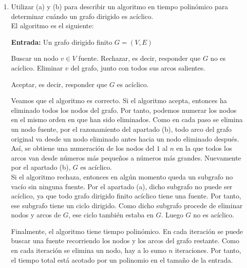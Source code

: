 \begin{ejercicio}
\begin{enumerate}
        \item[(c)] Utilizar (a) y (b) para describir un algoritmo en tiempo polinómico para determinar cuándo un grafo dirigido es acíclico. \\
            
            El algoritmo es el siguiente:

            \begin{algorithm}
                \caption{Decidir si un grafo dirigido es acíclico}
                \label{algorithm:aciclico}
                \begin{algorithmic}
                    \State \textbf{Entrada:} Un grafo dirigido finito $G=(V,E)$

                        \State Buscar un nodo $v\in V$ fuente.
                            \State Rechazar, es decir, responder que $G$ no es acíclico.
                        \EndIf
                        \State Eliminar $v$ del grafo, junto con todos sus arcos salientes.
                    \EndWhile

                    \State Aceptar, es decir, responder que $G$ es acíclico.
                \end{algorithmic}
            \end{algorithm}

            Veamos que el algoritmo es correcto. Si el algoritmo acepta, entonces ha eliminado todos los nodos del grafo. Por tanto, podemos numerar los nodos en el mismo orden en que han sido eliminados. Como en cada paso se elimina un nodo fuente, por el razonamiento del apartado (b), 
            todo arco del grafo original va desde un nodo eliminado antes hacia un nodo eliminado después. Así, se obtiene una numeración de los nodos del $1$ al $n$ en la que todos los arcos van desde números más pequeños a números más grandes. Nuevamente por el apartado (b), $G$ es acíclico. \\
            
            Si el algoritmo rechaza, entonces en algún momento queda un subgrafo no vacío sin ninguna fuente. Por el apartado (a), dicho subgrafo no puede ser acíclico, ya que todo grafo dirigido finito acíclico tiene una fuente. Por tanto, ese subgrafo tiene un ciclo dirigido. Como dicho subgrafo procede de eliminar nodos y arcos de $G$, ese ciclo también estaba en $G$. Luego $G$ no es acíclico.

            Finalmente, el algoritmo tiene tiempo polinómico. En cada iteración se puede buscar una fuente recorriendo los nodos y los arcos del grafo restante. Como en cada iteración se elimina un nodo, hay a lo sumo $n$ iteraciones. Por tanto, el tiempo total está acotado por un polinomio en el tamaño de la entrada.
    \end{enumerate}
\end{ejercicio}

